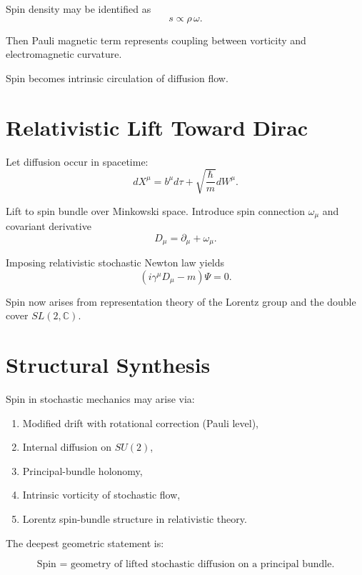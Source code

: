\documentclass[12pt]{article}
\begin{document}
Spin density may be identified as
\[
s \propto \rho\,\omega.
\]

Then Pauli magnetic term represents coupling between vorticity
and electromagnetic curvature.

Spin becomes intrinsic circulation of diffusion flow.

\section{Relativistic Lift Toward Dirac}

Let diffusion occur in spacetime:
\[
dX^\mu = b^\mu d\tau + \sqrt{\frac{\hbar}{m}} dW^\mu.
\]

Lift to spin bundle over Minkowski space.
Introduce spin connection $\omega_\mu$ and covariant derivative
\[
D_\mu = \partial_\mu + \omega_\mu.
\]

Imposing relativistic stochastic Newton law yields
\[
(i\gamma^\mu D_\mu - m)\Psi=0.
\]

Spin now arises from representation theory of the Lorentz group
and the double cover $SL(2,\mathbb{C})$.

\section{Structural Synthesis}

Spin in stochastic mechanics may arise via:

\begin{enumerate}
\item Modified drift with rotational correction (Pauli level),
\item Internal diffusion on $SU(2)$,
\item Principal-bundle holonomy,
\item Intrinsic vorticity of stochastic flow,
\item Lorentz spin-bundle structure in relativistic theory.
\end{enumerate}

The deepest geometric statement is:

\[
\boxed{
\text{Spin = geometry of lifted stochastic diffusion on a principal bundle.}
}
\]
\end{document}
